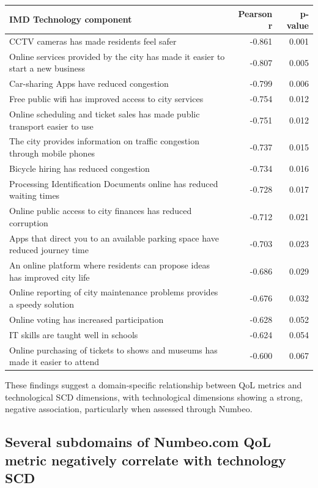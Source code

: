 \documentclass[
  english,
  12pt,
  a4paper,
]{scrartcl}
\begin{document}
\begin{longtable}[]{@{}lrr@{}}
\toprule\noalign{}
IMD Technology component & Pearson r & p-value \\
\midrule\noalign{}
\endhead
\bottomrule\noalign{}
\endlastfoot
CCTV cameras has made residents feel safer & -0.861 & 0.001 \\
Online services provided by the city has made it easier to start a new
business & -0.807 & 0.005 \\
Car-sharing Apps have reduced congestion & -0.799 & 0.006 \\
Free public wifi has improved access to city services & -0.754 &
0.012 \\
Online scheduling and ticket sales has made public transport easier to
use & -0.751 & 0.012 \\
The city provides information on traffic congestion through mobile
phones & -0.737 & 0.015 \\
Bicycle hiring has reduced congestion & -0.734 & 0.016 \\
Processing Identification Documents online has reduced waiting times &
-0.728 & 0.017 \\
Online public access to city finances has reduced corruption & -0.712 &
0.021 \\
Apps that direct you to an available parking space have reduced journey
time & -0.703 & 0.023 \\
An online platform where residents can propose ideas has improved city
life & -0.686 & 0.029 \\
Online reporting of city maintenance problems provides a speedy solution
& -0.676 & 0.032 \\
Online voting has increased participation & -0.628 & 0.052 \\
IT skills are taught well in schools & -0.624 & 0.054 \\
Online purchasing of tickets to shows and museums has made it easier to
attend & -0.600 & 0.067 \\
\end{longtable}

These findings suggest a domain-specific relationship between QoL
metrics and technological SCD dimensions, with technological dimensions
showing a strong, negative association, particularly when assessed
through Numbeo.

\subsection{Several subdomains of Numbeo.com QoL metric negatively
correlate with technology
SCD}\label{several-subdomains-of-numbeo.com-qol-metric-negatively-correlate-with-technology-scd}
\end{document}
